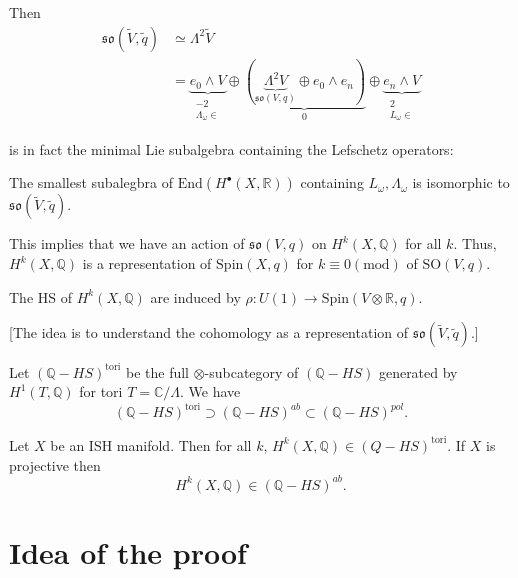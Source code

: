 Then
$$
\begin{aligned}
\mathfrak{so}(\tilde{V},\tilde{q})
&\simeq \Lambda^2\tilde{V}\\
&=\underbrace{e_0 \wedge V}_{\substack{-2 \\
\Lambda_\omega \in }}
\oplus\underbrace{(\underbrace{\Lambda^2V}
_{\mathfrak{so}(V,q)}
\oplus e_0 \wedge e_n)}_{0}
\oplus \underbrace{e_n\wedge V}_{\substack{2
\\ L_\omega \in}}
\end{aligned}
$$

\noindent
is in fact the minimal Lie subalgebra
containing
the Lefschetz operators:

\begin{theorem}
\label{theorem-vll}
The smallest subalegbra of
$\text{End}(H^\bullet(X,\mathbb{R}))$
containing $L_\omega, \Lambda_\omega$
is isomorphic to
$\mathfrak{so}(\tilde{V},\tilde{q})$.
\end{theorem}

\noindent
This implies that we have an action
of $\mathfrak{so}(V,q)$ on
$H^k(X,\mathbb{Q})$ for all $k$.
Thus, $H^k(X,\mathbb{Q})$ is a representation
of
$\text{Spin}(X,q)$ for $k \equiv 0
(\text{mod})$ of $\text{SO}(V,q)$.

The HS of $H^k(X,\mathbb{Q})$ are induced by
$\rho:U(1) \to \text{Spin}(V\otimes
\mathbb{R},q)$.

[The idea is to understand the cohomology
as a representation of
$\mathfrak{so}(\tilde{V},\tilde{q})$.]

Let $(\mathbb{Q}-HS)^{\text{tori}}$ be the
full
$\otimes$-subcategory of $(\mathbb{Q}-HS)$
generated
by $H^1(T,\mathbb{Q})$ for tori
$T=\mathbb{C}/\Lambda$.
We have
$$
(\mathbb{Q}-HS)^{\text{tori}}\supset
(\mathbb{Q}-HS)^{ab}
\subset (\mathbb{Q}-HS)^{pol}.
$$

\begin{theorem}
\label{theorem-ksv}
Let $X$ be an ISH manifold.
Then for all $k$,
$H^k(X,\mathbb{Q}) \in (Q-HS)^{\text{tori}}$.
If $X$ is projective then
$$
H^k(X,\mathbb{Q}) \in (\mathbb{Q}-HS)^{ab}.
$$
\end{theorem}

\section{Idea of the proof}
\label{section-proof}


